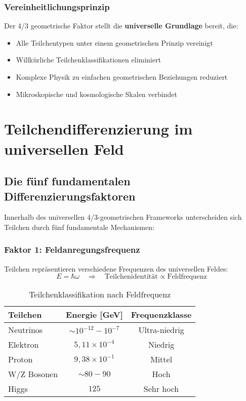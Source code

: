 \documentclass[12pt,a4paper]{article}
\newcommand{\myomega}{\ensuremath{\omega}}
\newcommand{\mytimes}{\ensuremath{\times}}
\newcommand{\myRightarrow}{\ensuremath{\Rightarrow}}
\newcommand{\mypropto}{\ensuremath{\propto}}
\newcommand{\mysim}{\ensuremath{\sim}}
\begin{document}
	\subsubsection{Vereinheitlichungsprinzip}
	\label{subsubsec:vereinheitlichungsprinzip}
	
	Der 4/3 geometrische Faktor stellt die \textbf{universelle Grundlage} bereit, die:
	\begin{itemize}
		\item Alle Teilchentypen unter einem geometrischen Prinzip vereinigt
		\item Willkürliche Teilchenklassifikationen eliminiert
		\item Komplexe Physik zu einfachen geometrischen Beziehungen reduziert
		\item Mikroskopische und kosmologische Skalen verbindet
	\end{itemize}
	
	\section{Teilchendifferenzierung im universellen Feld}
	\label{sec:teilchendifferenzierung}
	
	\subsection{Die fünf fundamentalen Differenzierungsfaktoren}
	\label{subsec:fuenf_faktoren}
	
	Innerhalb des universellen 4/3-geometrischen Frameworks unterscheiden sich Teilchen durch fünf fundamentale Mechanismen:
	
	\subsubsection{Faktor 1: Feldanregungsfrequenz}
	\label{subsubsec:anregungsfrequenz}
	
	Teilchen repräsentieren verschiedene Frequenzen des universellen Feldes:
	\begin{equation}
		E = \hbar \myomega \quad \myRightarrow \quad \text{Teilchenidentität} \mypropto \text{Feldfrequenz}
		\label{eq:frequenz_identitaet}
	\end{equation}
	
	\begin{table}[htbp]
		\centering
		\begin{tabular}{lcc}
			\toprule
			\textbf{Teilchen} & \textbf{Energie [GeV]} & \textbf{Frequenzklasse} \\
			\midrule
			Neutrinos & $\mysim 10^{-12} - 10^{-7}$ & Ultra-niedrig \\
			Elektron & $5,11 \mytimes 10^{-4}$ & Niedrig \\
			Proton & $9,38 \mytimes 10^{-1}$ & Mittel \\
			W/Z Bosonen & $\mysim 80-90$ & Hoch \\
			Higgs & $125$ & Sehr hoch \\
			\bottomrule
		\end{tabular}
		\caption{Teilchenklassifikation nach Feldfrequenz}
		\label{tab:frequenz_klassifikation}
	\end{table}
	
\end{document}
